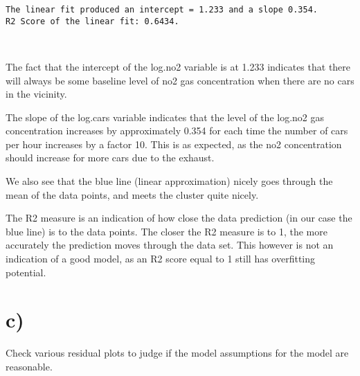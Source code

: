 \documentclass[11pt]{article}
\begin{document}
    \begin{Verbatim}[commandchars=\\\{\}]
The linear fit produced an intercept = 1.233 and a slope 0.354.
R2 Score of the linear fit:	0.6434.

    \end{Verbatim}

    \begin{center}
    \end{center}
    { \hspace*{\fill} \\}
    
    The fact that the intercept of the log.no2 variable is at 1.233
indicates that there will always be some baseline level of no2 gas
concentration when there are no cars in the vicinity.

The slope of the log.cars variable indicates that the level of the
log.no2 gas concentration increases by approximately 0.354 for each time
the number of cars per hour increases by a factor 10. This is as
expected, as the no2 concentration should increase for more cars due to
the exhaust.

We also see that the blue line (linear approximation) nicely goes
through the mean of the data points, and meets the cluster quite nicely.

The R2 measure is an indication of how close the data prediction (in our
case the blue line) is to the data points. The closer the R2 measure is
to 1, the more accurately the prediction moves through the data set.
This however is not an indication of a good model, as an R2 score equal
to 1 still has overfitting potential.

    \section{c)}\label{c}

Check various residual plots to judge if the model assumptions for the
model are reasonable.
\end{document}
